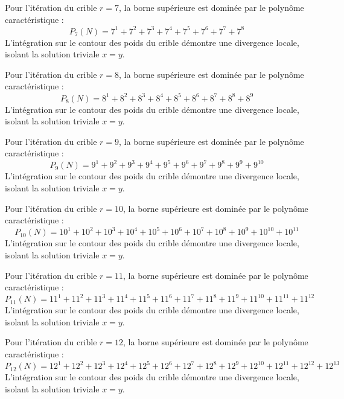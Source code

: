 \documentclass[12pt, a4paper]{article}
\begin{document}
Pour l'itération du crible $r = 7$, la borne supérieure est dominée par le polynôme caractéristique :
\begin{equation}
P_{7}(N) = 7^{1} + 7^{2} + 7^{3} + 7^{4} + 7^{5} + 7^{6} + 7^{7} + 7^{8}
\end{equation}
L'intégration sur le contour des poids du crible démontre une divergence locale, isolant la solution triviale $x=y$.


Pour l'itération du crible $r = 8$, la borne supérieure est dominée par le polynôme caractéristique :
\begin{equation}
P_{8}(N) = 8^{1} + 8^{2} + 8^{3} + 8^{4} + 8^{5} + 8^{6} + 8^{7} + 8^{8} + 8^{9}
\end{equation}
L'intégration sur le contour des poids du crible démontre une divergence locale, isolant la solution triviale $x=y$.


Pour l'itération du crible $r = 9$, la borne supérieure est dominée par le polynôme caractéristique :
\begin{equation}
P_{9}(N) = 9^{1} + 9^{2} + 9^{3} + 9^{4} + 9^{5} + 9^{6} + 9^{7} + 9^{8} + 9^{9} + 9^{10}
\end{equation}
L'intégration sur le contour des poids du crible démontre une divergence locale, isolant la solution triviale $x=y$.


Pour l'itération du crible $r = 10$, la borne supérieure est dominée par le polynôme caractéristique :
\begin{equation}
P_{10}(N) = 10^{1} + 10^{2} + 10^{3} + 10^{4} + 10^{5} + 10^{6} + 10^{7} + 10^{8} + 10^{9} + 10^{10} + 10^{11}
\end{equation}
L'intégration sur le contour des poids du crible démontre une divergence locale, isolant la solution triviale $x=y$.


Pour l'itération du crible $r = 11$, la borne supérieure est dominée par le polynôme caractéristique :
\begin{equation}
P_{11}(N) = 11^{1} + 11^{2} + 11^{3} + 11^{4} + 11^{5} + 11^{6} + 11^{7} + 11^{8} + 11^{9} + 11^{10} + 11^{11} + 11^{12}
\end{equation}
L'intégration sur le contour des poids du crible démontre une divergence locale, isolant la solution triviale $x=y$.


Pour l'itération du crible $r = 12$, la borne supérieure est dominée par le polynôme caractéristique :
\begin{equation}
P_{12}(N) = 12^{1} + 12^{2} + 12^{3} + 12^{4} + 12^{5} + 12^{6} + 12^{7} + 12^{8} + 12^{9} + 12^{10} + 12^{11} + 12^{12} + 12^{13}
\end{equation}
L'intégration sur le contour des poids du crible démontre une divergence locale, isolant la solution triviale $x=y$.
\end{document}
